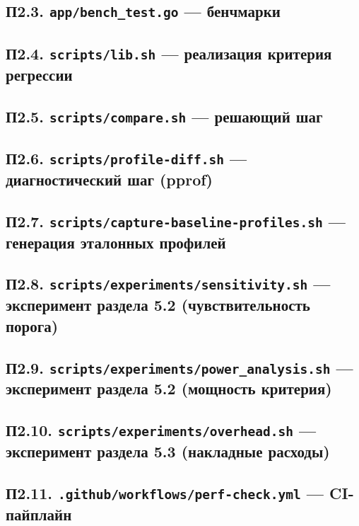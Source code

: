 \subsection*{П2.3. \texttt{app/\allowbreak bench\_test.go} --- бенчмарки}


\subsection*{П2.4. \texttt{scripts/\allowbreak lib.sh} --- реализация критерия регрессии}


\subsection*{П2.5. \texttt{scripts/\allowbreak compare.sh} --- решающий шаг}


\subsection*{П2.6. \texttt{scripts/\allowbreak profile-diff.sh} --- диагностический шаг (pprof)}


\subsection*{П2.7. \texttt{scripts/\allowbreak capture-baseline-profiles.sh} --- генерация эталонных профилей}


\subsection*{П2.8. \texttt{scripts/\allowbreak experiments/\allowbreak sensitivity.sh} --- эксперимент раздела 5.2 (чувствительность порога)}


\subsection*{П2.9. \texttt{scripts/\allowbreak experiments/\allowbreak power\_analysis.sh} --- эксперимент раздела 5.2 (мощность критерия)}


\subsection*{П2.10. \texttt{scripts/\allowbreak experiments/\allowbreak overhead.sh} --- эксперимент раздела 5.3 (накладные расходы)}


\subsection*{П2.11. \texttt{.github/\allowbreak workflows/\allowbreak perf-check.yml} --- CI-пайплайн}

